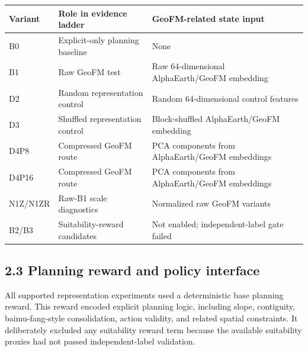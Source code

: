 \documentclass[
  11pt,
  a4paper,
]{article}
\newcounter{none} %
\begin{document}
{\def\LTcaptype{none} %
\begin{longtable}[]{@{}
  >{\raggedright\arraybackslash}p{}
  >{\raggedright\arraybackslash}p{}
  >{\raggedright\arraybackslash}p{}@{}}
\toprule\noalign{}
\begin{minipage}[b]{\linewidth}\raggedright
Variant
\end{minipage} & \begin{minipage}[b]{\linewidth}\raggedright
Role in evidence ladder
\end{minipage} & \begin{minipage}[b]{\linewidth}\raggedright
GeoFM-related state input
\end{minipage} \\
\midrule\noalign{}
\endhead
\bottomrule\noalign{}
\endlastfoot
B0 & Explicit-only planning baseline & None \\
B1 & Raw GeoFM test & Raw 64-dimensional AlphaEarth/GeoFM embedding \\
D2 & Random representation control & Random 64-dimensional control
features \\
D3 & Shuffled representation control & Block-shuffled AlphaEarth/GeoFM
embedding \\
D4P8 & Compressed GeoFM route & 8 PCA components from AlphaEarth/GeoFM
embeddings \\
D4P16 & Compressed GeoFM route & 16 PCA components from AlphaEarth/GeoFM
embeddings \\
N1Z/N1ZR & Raw-B1 scale diagnostics & Normalized raw GeoFM variants \\
B2/B3 & Suitability-reward candidates & Not enabled; independent-label
gate failed \\
\end{longtable}
}

\subsection{2.3 Planning reward and policy
interface}\label{planning-reward-and-policy-interface}

All supported representation experiments used a deterministic base
planning reward. This reward encoded explicit planning logic, including
slope, contiguity, baimu-fang-style consolidation, action validity, and
related spatial constraints. It deliberately excluded any suitability
reward term because the available suitability proxies had not passed
independent-label validation.
\end{document}
